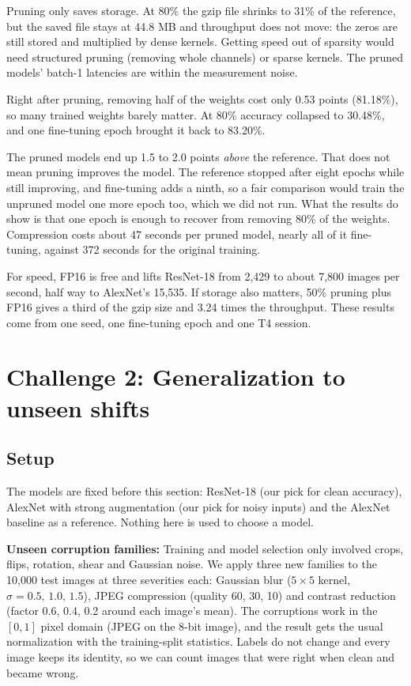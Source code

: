 \documentclass[11pt,a4paper]{article}
\begin{document}
Pruning only saves storage. At 80\% the gzip file shrinks to 31\% of the reference, but the saved file stays at 44.8 MB and throughput does not move: the zeros are still stored and multiplied by dense kernels. Getting speed out of sparsity would need structured pruning (removing whole channels) or sparse kernels. The pruned models' batch-1 latencies are within the measurement noise.

Right after pruning, removing half of the weights cost only 0.53 points (81.18\%), so many trained weights barely matter. At 80\% accuracy collapsed to 30.48\%, and one fine-tuning epoch brought it back to 83.20\%.

The pruned models end up 1.5 to 2.0 points \emph{above} the reference. That does not mean pruning improves the model. The reference stopped after eight epochs while still improving, and fine-tuning adds a ninth, so a fair comparison would train the unpruned model one more epoch too, which we did not run. What the results do show is that one epoch is enough to recover from removing 80\% of the weights. Compression costs about 47 seconds per pruned model, nearly all of it fine-tuning, against 372 seconds for the original training.

For speed, FP16 is free and lifts ResNet-18 from 2,429 to about 7,800 images per second, half way to AlexNet's 15,535. If storage also matters, 50\% pruning plus FP16 gives a third of the gzip size and 3.24 times the throughput. These results come from one seed, one fine-tuning epoch and one T4 session.

\section{Challenge 2: Generalization to unseen shifts}

\subsection{Setup}
The models are fixed before this section: ResNet-18 (our pick for clean accuracy), AlexNet with strong augmentation (our pick for noisy inputs) and the AlexNet baseline as a reference. Nothing here is used to choose a model.

\textbf{Unseen corruption families:} Training and model selection only involved crops, flips, rotation, shear and Gaussian noise. We apply three new families to the 10,000 test images at three severities each: Gaussian blur ($5\times5$ kernel, $\sigma=0.5,\,1.0,\,1.5$), JPEG compression (quality 60, 30, 10) and contrast reduction (factor 0.6, 0.4, 0.2 around each image's mean). The corruptions work in the $[0,1]$ pixel domain (JPEG on the 8-bit image), and the result gets the usual normalization with the training-split statistics. Labels do not change and every image keeps its identity, so we can count images that were right when clean and became wrong.
\end{document}
